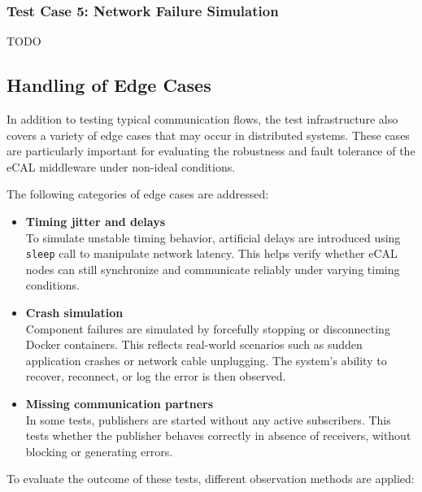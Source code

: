\subsubsection{Test Case 5: Network Failure Simulation}

TODO

\newpage
\subsection{Handling of Edge Cases}

In addition to testing typical communication flows, the test infrastructure also covers a variety of edge cases that may occur in distributed systems. These cases are particularly important for evaluating the robustness and fault tolerance of the eCAL middleware under non-ideal conditions.

\vspace{0.5em}
The following categories of edge cases are addressed:

\begin{itemize}
	\item \textbf{Timing jitter and delays} \\
	To simulate unstable timing behavior, artificial delays are introduced using \texttt{sleep} call to manipulate network latency. This helps verify whether eCAL nodes can still synchronize and communicate reliably under varying timing conditions.
	
	\item \textbf{Crash simulation} \\
	Component failures are simulated by forcefully stopping or disconnecting Docker containers. This reflects real-world scenarios such as sudden application crashes or network cable unplugging. The system’s ability to recover, reconnect, or log the error is then observed.
	
	\item \textbf{Missing communication partners} \\
	In some tests, publishers are started without any active subscribers. This tests whether the publisher behaves correctly in absence of receivers, without blocking or generating errors.
\end{itemize}

\vspace{0.5em}
To evaluate the outcome of these tests, different observation methods are applied:

